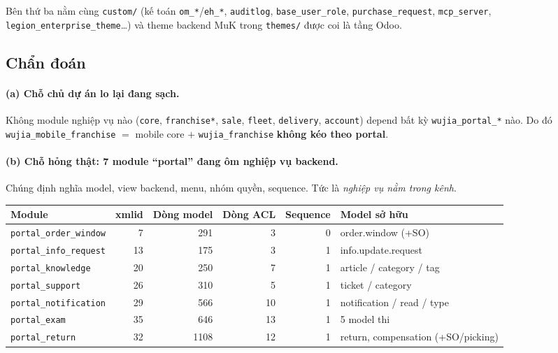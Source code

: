 Bên thứ ba nằm cùng \texttt{custom/} (kế toán \texttt{om\_*}/\texttt{eh\_*},
\texttt{auditlog}, \texttt{base\_user\_role}, \texttt{purchase\_request}, \texttt{mcp\_server},
\texttt{legion\_enterprise\_theme}\ldots) và theme backend MuK trong \texttt{themes/} được
coi là tầng Odoo.

\subsection*{Chẩn đoán}

\paragraph{(a) Chỗ chủ dự án lo lại đang sạch.} Không module nghiệp vụ nào
(\texttt{core}, \texttt{franchise*}, \texttt{sale}, \texttt{fleet}, \texttt{delivery},
\texttt{account}) depend bất kỳ \texttt{wujia\_portal\_*} nào. Do đó
\texttt{wujia\_mobile\_franchise} $=$ mobile core $+$ \texttt{wujia\_franchise}
\textbf{không kéo theo portal}.

\paragraph{(b) Chỗ hỏng thật: 7 module ``portal'' đang ôm nghiệp vụ backend.} Chúng định nghĩa
model, view backend, menu, nhóm quyền, sequence. Tức là \emph{nghiệp vụ nằm trong kênh}.

\begin{center}
\footnotesize
\begin{tabular}{lrrrrl}
\toprule
Module & xmlid & Dòng model & Dòng ACL & Sequence & Model sở hữu \\
\midrule
\texttt{portal\_order\_window}  & 7  & 291  & 3  & 0 & order.window (+SO) \\
\texttt{portal\_info\_request}  & 13 & 175  & 3  & 1 & info.update.request \\
\texttt{portal\_knowledge}      & 20 & 250  & 7  & 1 & article / category / tag \\
\texttt{portal\_support}        & 26 & 310  & 5  & 1 & ticket / category \\
\texttt{portal\_notification}   & 29 & 566  & 10 & 1 & notification / read / type \\
\texttt{portal\_exam}           & 35 & 646  & 13 & 1 & 5 model thi \\
\texttt{portal\_return}         & 32 & 1108 & 12 & 1 & return, compensation (+SO/picking) \\
\bottomrule
\end{tabular}
\end{center}

